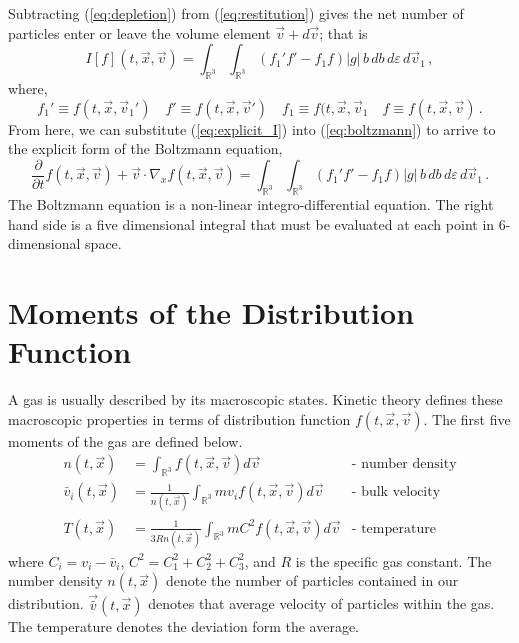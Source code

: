 \documentclass[12pt]{CSUNthesis}
\def\R{\mathbb{R}}
\def\R{\mathbb{R}}
\newcommand{\dydx}[2]{\frac{\partial{#1}}{\partial{#2}}}
\newcommand{\vecx}{\vec{x}}
\newcommand{\vecv}{\vec{v}}
\newcommand{\bulkv}{\vec{\bar{v}}} %
\begin{document}
Subtracting (\ref{eq:depletion}) from (\ref{eq:restitution}) gives the net number of particles enter or leave the volume element $\vecv + d\vecv$; that is
\begin{equation}
\label{eq:explicit_I}
I[f](t, \vecx, \vecv) = \int_{\R^3} \int_{\R^3} (f_1' f' - f_1 f) |g|\, b\, db\, d\varepsilon\, d\vecv_1\, ,
\end{equation}
where,
\begin{equation*}
f_1' \equiv f(t, \vecx, \vecv_1')\quad f' \equiv f(t, \vecx, \vecv') \quad f_1 \equiv f(t, \vecx, \vecv_1 \quad f \equiv f(t, \vecx, \vecv)\, .
\end{equation*}
From here, we can substitute (\ref{eq:explicit_I}) into (\ref{eq:boltzmann}) to arrive to the explicit form of the Boltzmann equation,
\begin{equation}
\dydx{}{t}f(t, \vecx, \vecv) + \vecv \cdot \nabla_x f(t, \vecx, \vecv) = \int_{\R^3} \int_{\R^3} (f_1' f' - f_1 f) |g|\, b\, db\, d\varepsilon\, d\vecv_1\, .
\end{equation}
The Boltzmann equation is a non-linear integro-differential equation. The right hand side is a five dimensional integral that must be evaluated at each point in 6-dimensional space.

\section{Moments of the Distribution Function}

A gas is usually described by its macroscopic states. Kinetic theory defines these macroscopic properties in terms of distribution function $f(t,\vecx, \vecv)$. The first five moments of the gas are defined below.
\begin{align}
	n(t,\vec{x})&=\int_{\mathbb{R}^3}  f(t,\vec{x},\vec{v}) d\vec{v} &\text{- number density}  \label{eq:dens} \\
	\bar{v}_i(t,\vec{x})&=\frac{1}{n(t,\vec{x})} \int_{\mathbb{R}^3} m v_i f(t,\vec{x},\vec{v}) d\vec{v} &\text{- bulk velocity} \label{eq:bulk} \\
	T(t,\vec{x}) &= \frac{1}{3Rn(t,\vecx)}\int_{\mathbb{R}^3} m C^2 f(t,\vec{x},\vec{v}) d\vec{v} &\text{- temperature} \label{eq:temperature}
\end{align}
where $C_i=v_i-\bar{v}_i$, $C^2=C_1^2 + C_2^2 + C_3^2$, and $R$ is the specific gas constant. The number density $n(t, \vecx)$ denote the number of particles contained in our distribution. $\bulkv (t,\vecx)$ denotes that average velocity of particles within the gas. The temperature denotes the deviation form the average. 
\end{document}
